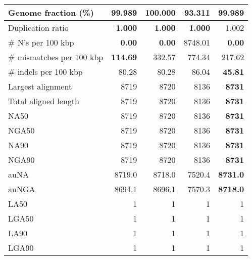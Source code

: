 \documentclass[12pt,a4paper]{article}
\begin{document}
\begin{table}[ht]
\begin{center}
\begin{tabular}{|l*{4}{|r}|}
Genome fraction (\%) & 99.989 & {\bf 100.000} & 93.311 & 99.989 \\ \hline
Duplication ratio & {\bf 1.000} & {\bf 1.000} & {\bf 1.000} & 1.002 \\ \hline
\# N's per 100 kbp & {\bf 0.00} & {\bf 0.00} & 8748.01 & {\bf 0.00} \\ \hline
\# mismatches per 100 kbp & {\bf 114.69} & 332.57 & 774.34 & 217.62 \\ \hline
\# indels per 100 kbp & 80.28 & 80.28 & 86.04 & {\bf 45.81} \\ \hline
Largest alignment & 8719 & 8720 & 8136 & {\bf 8731} \\ \hline
Total aligned length & 8719 & 8720 & 8136 & {\bf 8731} \\ \hline
NA50 & 8719 & 8720 & 8136 & {\bf 8731} \\ \hline
NGA50 & 8719 & 8720 & 8136 & {\bf 8731} \\ \hline
NA90 & 8719 & 8720 & 8136 & {\bf 8731} \\ \hline
NGA90 & 8719 & 8720 & 8136 & {\bf 8731} \\ \hline
auNA & 8719.0 & 8718.0 & 7520.4 & {\bf 8731.0} \\ \hline
auNGA & 8694.1 & 8696.1 & 7570.3 & {\bf 8718.0} \\ \hline
LA50 & 1 & 1 & 1 & 1 \\ \hline
LGA50 & 1 & 1 & 1 & 1 \\ \hline
LA90 & 1 & 1 & 1 & 1 \\ \hline
LGA90 & 1 & 1 & 1 & 1 \\ \hline
\end{tabular}
\end{center}
\end{table}
\end{document}
